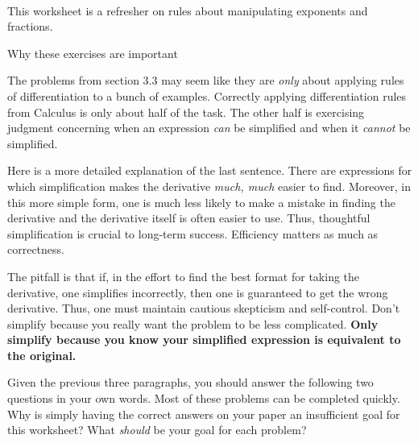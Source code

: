 \documentclass[11pt,fleqn]{article}
\begin{document}
\renewcommand{\headrulewidth}{0pt}
\newcommand{\blank}[1]{\rule{#1}{0.75pt}}
\newcommand{\bc}{\begin{center}}
\newcommand{\ec}{\end{center}}
\renewcommand{\d}{\displaystyle}

\vspace*{-0.7in}

\begin{center}
  \large
  \\ \vfill
\end{center}
 This worksheet is a refresher on rules about manipulating exponents and fractions. \\ \vfill
 
 \begin{center} Why these exercises are important \end{center}
 
 The problems from section 3.3 may seem like they are \emph{only} about applying rules of differentiation to a bunch of examples. Correctly applying differentiation rules from Calculus is only about half of the task. The other half is exercising judgment concerning when an expression \emph{can} be simplified and when it \emph{cannot} be simplified. \\ \vfill
 
Here is a more detailed explanation of the last sentence. There are expressions for which simplification makes the derivative \emph{much, much} easier to find. Moreover, in this more simple form, one is much less likely to make a mistake in finding the derivative and the derivative itself is often easier to use. Thus, thoughtful simplification is crucial to long-term success. Efficiency matters as much as correctness. \\ \vfill
 
The pitfall is that if, in the effort to find the best format for taking the derivative, one simplifies incorrectly, then one is guaranteed to get the wrong derivative. Thus, one must maintain cautious skepticism and self-control. Don't simplify because you really want the problem to be less complicated. \textbf{Only simplify because you know your simplified expression is equivalent to the original.}\\ \vfill
 
Given the previous three paragraphs, you should answer the following two questions in your own words. Most of these problems can be completed quickly. Why is simply having the correct answers on your paper an insufficient goal for this worksheet? What \emph{should} be your goal for each problem?\\ \vfill
\end{document}
